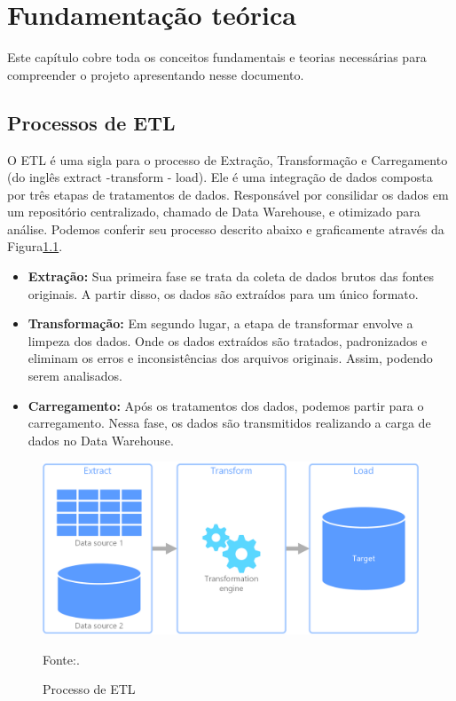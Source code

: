 \chapter{Fundamentação teórica}

Este capítulo cobre toda os conceitos fundamentais e teorias necessárias para compreender o projeto apresentando nesse documento.

\section{Processos de ETL}

O ETL é uma sigla para o processo de Extração, Transformação e Carregamento (do inglês extract -transform - load). Ele é uma integração de dados composta por três etapas de tratamentos de dados. Responsável por consilidar os dados em um repositório centralizado, chamado de Data Warehouse, e otimizado para análise. Podemos conferir seu processo descrito abaixo e graficamente através da Figura\ref{fig:etl_process}. \cite{ucommerce_etl}

\begin{itemize}
    \item \textbf{Extração:} Sua primeira fase se trata da coleta de dados brutos das fontes originais. A partir disso, os dados são extraídos para um único formato.
    \item \textbf{Transformação:} Em segundo lugar, a etapa de transformar envolve a limpeza dos dados. Onde os dados extraídos são tratados, padronizados e eliminam os erros e inconsistências dos arquivos originais. Assim, podendo serem analisados.
    \item \textbf{Carregamento:} Após os tratamentos dos dados, podemos partir para o carregamento. Nessa fase, os dados são transmitidos realizando a carga de dados no Data Warehouse.
\end{itemize}

\begin{figure}[H]
  \centering
  \caption{Processo de ETL}\label{fig:etl_process}
  \includegraphics[width=.6\linewidth]{imagens/etl.png}
  \par
  \footnotesize{Fonte:\cite{microsoft_etl}.}
\end{figure}

